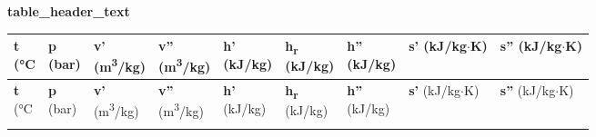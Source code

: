 \begin{center}
    \textbf{ {{ table_header_text }} }
\end{center}
\vspace{0.2cm} %

\begin{longtable}{|>{\raggedleft\arraybackslash}p{1.2cm}|>{\raggedleft\arraybackslash}p{1.8cm}|>{\raggedleft\arraybackslash}p{1.8cm}|>{\raggedleft\arraybackslash}p{1.8cm}|>{\raggedleft\arraybackslash}p{1.5cm}|
>{\raggedleft\arraybackslash}p{1.5cm}|>{\raggedleft\arraybackslash}p{1.5cm}|>{\raggedleft\arraybackslash}p{1.5cm}|>{\raggedleft\arraybackslash}p{1.5cm}|}
\hline
\small \makecell{\textbf{t} \\ (°C} & \small \makecell{\textbf{p} \\ (bar)} 
& \small \makecell{\textbf{v'} \\ (m\textsuperscript{3}/kg)} & \small \makecell{\textbf{v''} \\ (m\textsuperscript{3}/kg)} 
& \small \makecell{\textbf{h'} \\ (kJ/kg)} & \small \makecell{\textbf{h\textsubscript{r}} \\ (kJ/kg)} & \small \makecell{\textbf{h''} \\ (kJ/kg)} 
& \small \makecell{\textbf{s'} \\ (kJ/kg$\cdot$K)} & \small \makecell{\textbf{s''} \\ (kJ/kg$\cdot$K)} \\
\hline
\endfirsthead

\hline
\small \makecell{\textbf{t} \\ (°C} & \small \makecell{\textbf{p} \\ (bar)} 
& \small \makecell{\textbf{v'} \\ (m\textsuperscript{3}/kg)} & \small \makecell{\textbf{v''} \\ (m\textsuperscript{3}/kg)} 
& \small \makecell{\textbf{h'} \\ (kJ/kg)} & \small \makecell{\textbf{h\textsubscript{r}} \\ (kJ/kg)} & \small \makecell{\textbf{h''} \\ (kJ/kg)} 
& \small \makecell{\textbf{s'} \\ (kJ/kg$\cdot$K)} & \small \makecell{\textbf{s''} \\ (kJ/kg$\cdot$K)} \\
\hline
\endhead

\hline
\endfoot

\hline
\endlastfoot

{%
{%
{{ item }}{%
{%
{%

\end{longtable}
